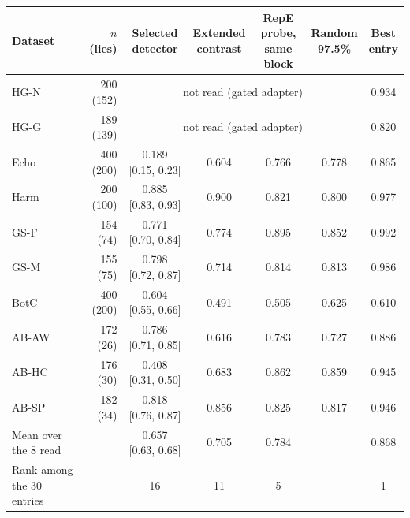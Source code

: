 \begin{tabular}{@{}l r ccc c c@{}}
\toprule
Dataset & $n$ (lies) & \shortstack{Selected\\detector} & \shortstack{Extended\\contrast} & \shortstack{RepE probe,\\same block} & \shortstack{Random\\97.5\%} & \shortstack{Best\\entry} \\
\midrule
HG-N & 200 (152) & \multicolumn{4}{c}{not read (gated adapter)} & 0.934 \\
HG-G & 189 (139) & \multicolumn{4}{c}{not read (gated adapter)} & 0.820 \\
Echo & 400 (200) & 0.189 [0.15, 0.23] & 0.604 & 0.766 & 0.778 & 0.865 \\
Harm & 200 (100) & 0.885 [0.83, 0.93] & 0.900 & 0.821 & 0.800 & 0.977 \\
GS-F & 154 (74) & 0.771 [0.70, 0.84] & 0.774 & 0.895 & 0.852 & 0.992 \\
GS-M & 155 (75) & 0.798 [0.72, 0.87] & 0.714 & 0.814 & 0.813 & 0.986 \\
BotC & 400 (200) & 0.604 [0.55, 0.66] & 0.491 & 0.505 & 0.625 & 0.610 \\
AB-AW & 172 (26) & 0.786 [0.71, 0.85] & 0.616 & 0.783 & 0.727 & 0.886 \\
AB-HC & 176 (30) & 0.408 [0.31, 0.50] & 0.683 & 0.862 & 0.859 & 0.945 \\
AB-SP & 182 (34) & 0.818 [0.76, 0.87] & 0.856 & 0.825 & 0.817 & 0.946 \\
\midrule
Mean over the 8 read & & 0.657 [0.63, 0.68] & 0.705 & 0.784 & & 0.868 \\
Rank among the 30 entries & & 16 & 11 & 5 & & 1 \\
\bottomrule
\end{tabular}
